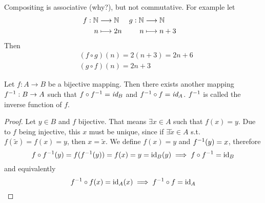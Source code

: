 \documentclass[../../script.tex]{subfiles}
\begin{document}
\begin{rem}
Compositing is associative (why?), but not commutative. For example let
\begin{align*}
	&\begin{aligned}
		f: \mathbb{N} &\longrightarrow \mathbb{N} \\
		n &\longmapsto 2n
	\end{aligned} &
	&\begin{aligned}
		g: \mathbb{N} &\longrightarrow \mathbb{N} \\
		n &\longmapsto n + 3
	\end{aligned}
\end{align*}
Then
\begin{align*}
	&(f \circ g)(n) = 2(n + 3) = 2n + 6 \\
	&(g \circ f)(n) = 2n + 3
\end{align*}
\end{rem}

\begin{thm}
Let $f: A \rightarrow B$ be a bijective mapping. Then there exists another mapping ${f}^{-1}: B \rightarrow A$ such that $f \circ {f}^{-1} = \emph{\text{id}}_B$ and ${f}^{-1} \circ f = \emph{\text{id}}_A$. ${f}^{-1}$ is called the inverse function of $f$.
\end{thm}
\begin{proof}
Let $y \in B$ and $f$ bijective. That means $\exists x \in A$ such that $f(x) = y$. Due to $f$ being injective, this $x$ must be unique, since if $\exists \tilde{x} \in A$ s.t. $f(\tilde{x}) = f(x) = y$, then $x = \tilde{x}$. We define $f(x) = y$ and ${f}^{-1}(y) = x$, therefore
\begin{equation}
	f \circ {f}^{-1}(y) = f({f}^{-1}(y)) = f(x) = y = \text{id}_B(y) \implies f \circ {f}^{-1} = \text{id}_B
\end{equation}
and equivalently
\begin{equation}
	{f}^{-1} \circ f(x) = \text{id}_A(x) \implies {f}^{-1} \circ f = \text{id}_A
\end{equation}
\end{proof}
\end{document}
